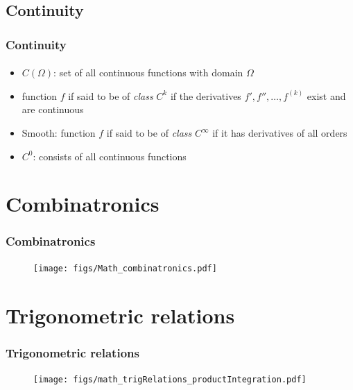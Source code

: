 \subsection{Continuity}
\begin{frame}
\frametitle{Continuity}
\framesubtitle{}
\logoCSIPCPL\mypagenum\mypagenum
	\begin{itemize}
		\item $C(\Omega)$: set of all continuous functions with domain $\Omega$
		\item function $f$ if said to be of \emph{class} $C^k$ if the derivatives $f', f'', \ldots, f^{(k)}$ exist and are continuous
		\item Smooth: function $f$ if said to be of \emph{class} $C^\infty$ if it has derivatives of all orders
		\item $C^0$: consists of all continuous functions
	\end{itemize}
\end{frame}


\section{Combinatronics}
\begin{frame}
\frametitle{Combinatronics}
\framesubtitle{}
\logoCSIPCPL\mypagenum\mypagenum
	\begin{figure}
		\texttt{[image: figs/Math\_combinatronics.pdf]}
	\end{figure}
\end{frame}

\section{Trigonometric relations}
\begin{frame}
\frametitle{Trigonometric relations}
\framesubtitle{}
\logoCSIPCPL\mypagenum\mypagenum
	\begin{figure}
		\texttt{[image: figs/math\_trigRelations\_productIntegration.pdf]}
	\end{figure}
\end{frame}



